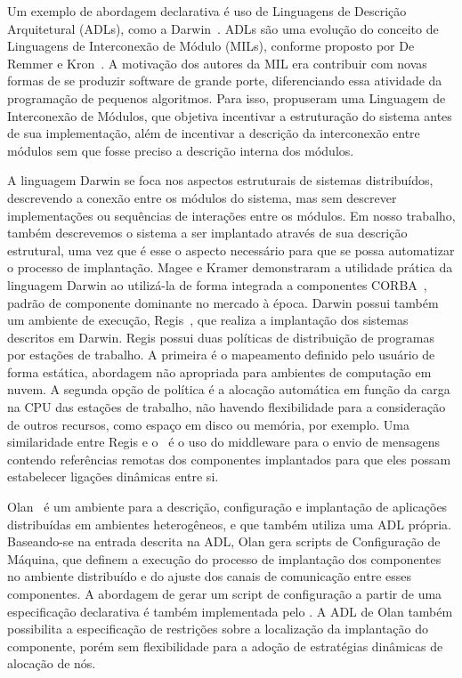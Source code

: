 Um exemplo de abordagem declarativa é uso de Linguagens de Descrição Arquitetural (ADLs), como a Darwin~\cite{Magee1996Dynamic}. ADLs são uma evolução do conceito de Linguagens de Interconexão de Módulo (MILs), conforme proposto por De Remmer e Kron~\cite{DeRemer1976Programming}. A motivação dos autores da MIL era contribuir com novas formas de se produzir software de grande porte, diferenciando essa atividade da programação de pequenos algoritmos. Para isso, propuseram uma Linguagem de Interconexão de Módulos, que objetiva incentivar a estruturação do sistema antes de sua implementação, além de incentivar a descrição da interconexão entre módulos sem que fosse preciso a descrição interna dos módulos. 

A linguagem Darwin se foca nos aspectos estruturais de sistemas distribuídos, descrevendo a conexão entre os módulos do sistema, mas sem descrever implementações ou sequências de interações entre os módulos. Em nosso trabalho, também descrevemos o sistema a ser implantado através de sua descrição estrutural, uma vez que é esse o aspecto necessário para que se possa automatizar o processo de implantação. Magee e Kramer demonstraram a utilidade prática da linguagem Darwin ao utilizá-la de forma integrada a componentes CORBA~\cite{Magee1997Corba}, padrão de componente dominante no mercado à época. Darwin possui também um ambiente de execução, Regis~\cite{Magee1994Regis}, que realiza a implantação dos sistemas descritos em Darwin. Regis possui duas políticas de distribuição de programas por estações de trabalho. A primeira é o mapeamento definido pelo usuário de forma estática, abordagem não apropriada para ambientes de computação em nuvem. A segunda opção de política é a alocação automática em função da carga na CPU das estações de trabalho, não havendo flexibilidade para a consideração de outros recursos, como espaço em disco ou memória, por exemplo. Uma similaridade entre Regis e o \ee\ é o uso do middleware para o envio de mensagens contendo referências remotas dos componentes implantados para que eles possam estabelecer ligações dinâmicas entre si.

Olan~\cite{Balter1998Olan} é um ambiente para a descrição, configuração e implantação de aplicações distribuídas em ambientes heterogêneos, e que também utiliza uma ADL própria. Baseando-se na entrada descrita na ADL, Olan gera scripts de Configuração de Máquina, que definem a execução do processo de implantação dos componentes no ambiente distribuído e do ajuste dos canais de comunicação entre esses componentes. A abordagem de gerar um script de configuração a partir de uma especificação declarativa é também implementada pelo \ee. A ADL de Olan também possibilita a especificação de restrições sobre a localização da implantação do componente, porém sem flexibilidade para a adoção de estratégias dinâmicas de alocação de nós.

